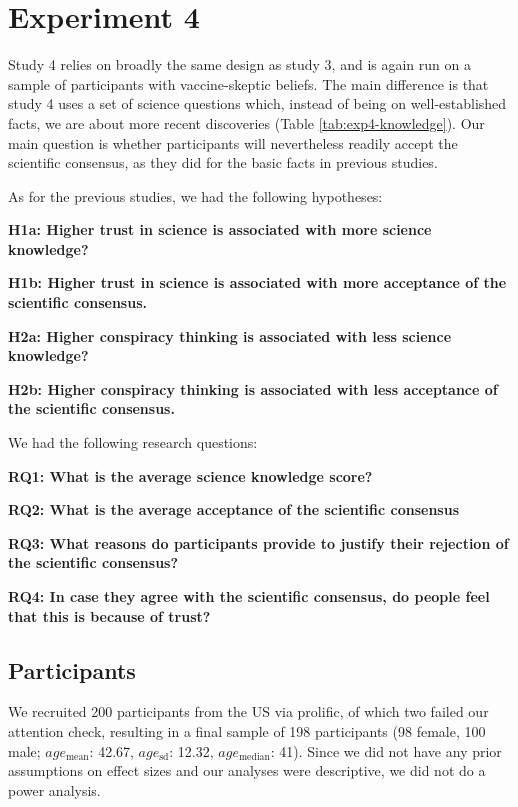 \documentclass[
  doc,floatsintext]{apa6}
\begin{document}
\clearpage

\section{Experiment 4}\label{exp4}

Study 4 relies on broadly the same design as study 3, and is again run on a sample of participants with vaccine-skeptic beliefs. The main difference is that study 4 uses a set of science questions which, instead of being on well-established facts, we are about more recent discoveries (Table \ref{tab:exp4-knowledge}). Our main question is whether participants will nevertheless readily accept the scientific consensus, as they did for the basic facts in previous studies.

As for the previous studies, we had the following hypotheses:

\textbf{H1a: Higher trust in science is associated with more science knowledge?}

\textbf{H1b: Higher trust in science is associated with more acceptance of the scientific consensus.}

\textbf{H2a: Higher conspiracy thinking is associated with less science knowledge?}

\textbf{H2b: Higher conspiracy thinking is associated with less acceptance of the scientific consensus.}

We had the following research questions:

\textbf{RQ1: What is the average science knowledge score?}

\textbf{RQ2: What is the average acceptance of the scientific consensus}

\textbf{RQ3: What reasons do participants provide to justify their rejection of the scientific consensus?}

\textbf{RQ4: In case they agree with the scientific consensus, do people feel that this is because of trust?}

\subsection{Participants}\label{participants-4}

We recruited 200 participants from the US via prolific, of which two failed our attention check, resulting in a final sample of 198 participants (98 female, 100 male; \(age_\text{mean}\): 42.67, \(age_\text{sd}\): 12.32, \(age_\text{median}\): 41). Since we did not have any prior assumptions on effect sizes and our analyses were descriptive, we did not do a power analysis.
\end{document}
